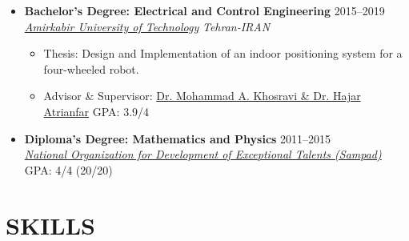 \documentclass[11pt,a4paper,sans]{moderncv} %
\begin{document}
\begin{itemize}
  \vspace{1em}
		\item \textbf{Bachelor's Degree: Electrical and Control Engineering} \hfill 2015--2019 \\
		\href{https://aut.ac.ir/en}{ \emph{Amirkabir University of Technology}} \hfill \emph{Tehran-IRAN}
		
		\begin{itemize}
   \item Thesis: Design and Implementation of an indoor positioning system for a four-wheeled robot.
   \item {Advisor \& Supervisor: \href{https://aut.ac.ir/cv/2273/MohammadAzam-Khosravi?slc_lang=en&&cv=2273&mod=scv}{Dr. Mohammad A. Khosravi \& Dr. Hajar Atrianfar}} \hspace{10 pt}  \hspace{10 pt}  \hfill  GPA: 3.9/4
		\end{itemize}
   \vspace{1em}
		\item \textbf{Diploma's Degree: Mathematics and Physics} \hfill 2011--2015 \\
		\href{https://en.wikipedia.org/wiki/National_Organization_for_Development_of_Exceptional_Talents}{ \emph{National Organization for Development of Exceptional Talents (Sampad)}} \hfill GPA: 4/4 (20/20)
		
	\end{itemize}
	

 	\section{SKILLS}
	
\end{document}
